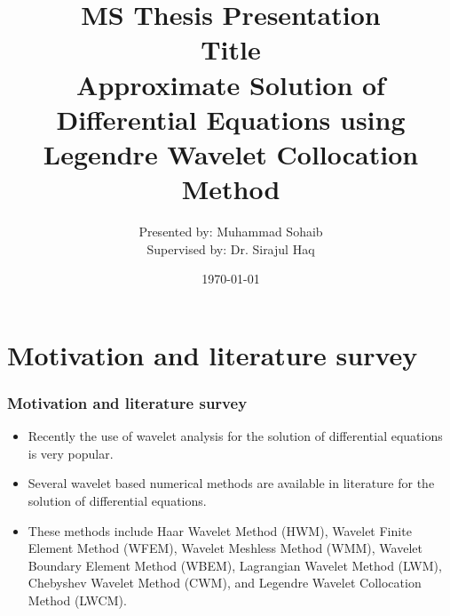 \documentclass{beamer}
\begin{document}
	\newcommand{\defeq}{\stackrel{\text{def}}{=}}	
	\title[MS Thesis Presentation \hspace{1.2in}\insertframenumber]{MS Thesis Presentation\\Title\\Approximate Solution of Differential Equations using Legendre Wavelet Collocation Method}
	\author[Muhammad Sohaib]{Presented by: Muhammad Sohaib\\ Supervised by: Dr. Sirajul Haq}
	\date{\today}
	\subject{Informatics}
	\frame{\titlepage}
	{\small
		
	}
\section{Motivation and literature survey}
	\begin{frame}\frametitle{Motivation and literature survey}
		\begin{itemize}
			\justifying
		 \item	Recently the use of wavelet analysis for the solution of differential equations is very popular.
		 \item	Several wavelet based numerical methods are available in literature for the solution of differential equations.	
		 \item    These methods include Haar Wavelet Method (HWM), Wavelet Finite Element Method (WFEM), Wavelet Meshless  Method (WMM), Wavelet Boundary Element Method (WBEM), Lagrangian Wavelet Method (LWM), Chebyshev Wavelet Method (CWM), and Legendre Wavelet Collocation Method (LWCM)\cite{P1,P2,P3,P4}.
		\end{itemize}
	\end{frame}
\end{document}
